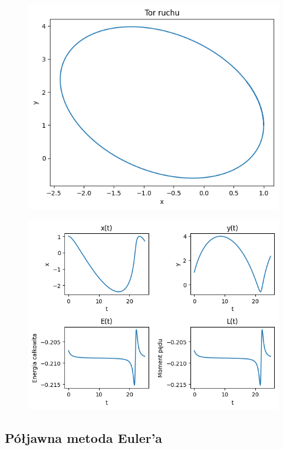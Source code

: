 \documentclass{article}
\begin{document}
	\begin{figure}[h]
		\centering
		\includegraphics[scale = 0.7]{wykres3.png}
	\end{figure}

	\begin{figure}[h]
		\centering
		\includegraphics[scale = 0.70]{wykres4.png}
	\end{figure}

	\newpage

	\subsection*{Półjawna metoda Euler'a}
\end{document}
